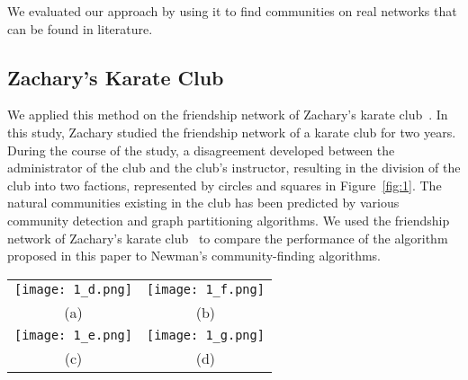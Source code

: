\documentclass{sig-alternate}
\newcommand{\figref}[1]{Figure~\ref{#1}}
\begin{document}
We evaluated our approach by using it to find communities on real networks that can be found in literature.

\subsection{Zachary's Karate Club}



We applied this method on the friendship network of Zachary's karate club~\cite{Zachary}. In this study, Zachary studied the friendship network of a karate club for two years. During the course of the study, a disagreement developed between the administrator of the club and the club's instructor, resulting in the division of the club into two factions, represented by circles and  squares in \figref{fig:1}. The natural communities existing in the club has been predicted by various community detection and graph partitioning algorithms.
We used the friendship network of Zachary's karate club~\cite{Zachary} to compare the performance of the algorithm  proposed in this paper to Newman's community-finding algorithms. 

\begin{figure*}[tbh]
\begin{tabular}{cc}
\texttt{[image: 1\_d.png]} &
    \texttt{[image: 1\_f.png]}\\
  (a) & (b) \\
 \texttt{[image: 1\_e.png]} &
 \texttt{[image: 1\_g.png]}\\
(c) & (d) 
\end{tabular}
\caption{ Results of applying different community finding algorithms to Zachary's karate club network. The numbered vertices represent the members of the club and edges represent friendships. The factions in which the clubs split up during the course of study are shown by squares and circles. 
(a \& b) Communities found after running a single iteration (graph bisection) using (a) Newman's and (b) the proposed algorithms.
(c \& d) Natural communities found by running (c) Newman's algorithm and (d) the proposed algorith until termination condition is reached.
}
 \label{fig:1}
\end{figure*}
\end{document}
